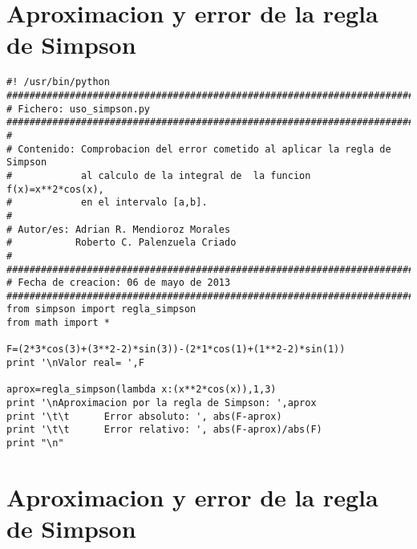 \section{Aproximacion y error de la regla de Simpson}
\label{Apendice3:error1}

\begin{center}
\begin{footnotesize}
\begin{verbatim}
#! /usr/bin/python
###################################################################################
# Fichero: uso_simpson.py
###################################################################################
#
# Contenido: Comprobacion del error cometido al aplicar la regla de Simpson
#            al calculo de la integral de  la funcion f(x)=x**2*cos(x), 
#            en el intervalo [a,b].
#
# Autor/es: Adrian R. Mendioroz Morales
#           Roberto C. Palenzuela Criado
#
###################################################################################
# Fecha de creacion: 06 de mayo de 2013 
###################################################################################
from simpson import regla_simpson
from math import *

F=(2*3*cos(3)+(3**2-2)*sin(3))-(2*1*cos(1)+(1**2-2)*sin(1))
print '\nValor real= ',F

aprox=regla_simpson(lambda x:(x**2*cos(x)),1,3)
print '\nAproximacion por la regla de Simpson: ',aprox
print '\t\t      Error absoluto: ', abs(F-aprox)
print '\t\t      Error relativo: ', abs(F-aprox)/abs(F)
print "\n"
\end{verbatim}
\end{footnotesize}
\end{center}


\section{Aproximacion y error de la regla de Simpson}
\label{Apendice3:error2}

